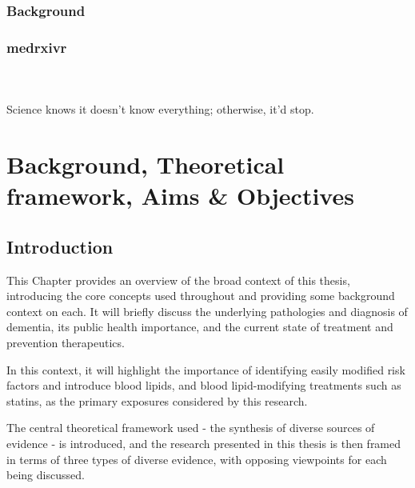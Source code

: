 \documentclass[a4paper, twoside]{templates/ociamthesis}
\begin{document}
\hypertarget{background}{%
\subsection{Background}\label{background}}

\hypertarget{medrxivr}{%
\subsection{medrxivr}\label{medrxivr}}

\hypertarget{section}{%
\subsection{}\label{section}}

~

\begin{savequote}
Science knows it doesn't know everything; otherwise, it'd stop.
\end{savequote}



\hypertarget{background-heading}{%
\chapter{Background, Theoretical framework, Aims \& Objectives}\label{background-heading}}

\minitoc 

\hypertarget{introduction}{%
\section{Introduction}\label{introduction}}

This Chapter provides an overview of the broad context of this thesis, introducing the core concepts used throughout and providing some background context on each. It will briefly discuss the underlying pathologies and diagnosis of dementia, its public health importance, and the current state of treatment and prevention therapeutics.

In this context, it will highlight the importance of identifying easily modified risk factors and introduce blood lipids, and blood lipid-modifying treatments such as statins, as the primary exposures considered by this research.

The central theoretical framework used - the synthesis of diverse sources of evidence - is introduced, and the research presented in this thesis is then framed in terms of three types of diverse evidence, with opposing viewpoints for each being discussed.
\end{document}
